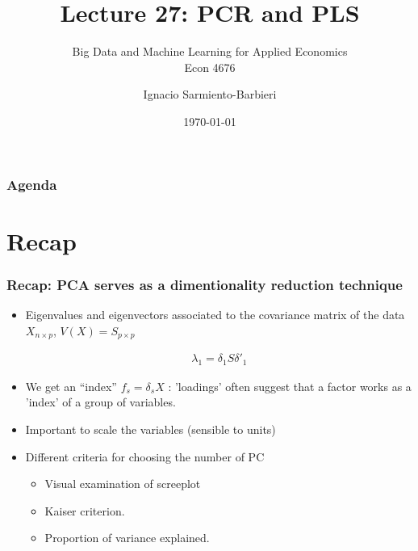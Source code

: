 \documentclass[
  shownotes,
  xcolor={svgnames},
  hyperref={colorlinks,citecolor=DarkBlue,linkcolor=DarkRed,urlcolor=DarkBlue}
  , aspectratio=169]{beamer}
\begin{document}
 
\title[Lecture 27]{Lecture 27:   PCR and PLS}
\subtitle{Big Data and Machine Learning for Applied Economics \\ Econ 4676}
\date{\today}

\author[Sarmiento-Barbieri]{Ignacio Sarmiento-Barbieri}


\begin{frame}[noframenumbering]
\maketitle
\end{frame}






\begin{frame}
\frametitle{Agenda}

\tableofcontents

\end{frame}

\section{Recap}
\begin{frame}[fragile]
\frametitle{Recap: PCA serves as a dimentionality reduction technique }


\begin{itemize}

\item Eigenvalues and eigenvectors associated to the covariance matrix of the data $X_{n\times p}$, $V(X)=S_{p\times p}$
  
  \begin{align}
  \lambda_1 = \delta_1 S \delta'_1 
  \end{align}
\medskip
\item We get an ``index'' $f_s = \delta_s X$ : 'loadings' often suggest that a factor works as a 'index' of a group of variables.
\medskip
\item Important to scale the variables (sensible to units)
\medskip
\item Different criteria for choosing the number of PC

\begin{itemize}
  \item Visual examination of screeplot
  \item Kaiser criterion.
  \item Proportion of variance explained.
\end{itemize}
\end{itemize}

\end{frame}
\end{document}
